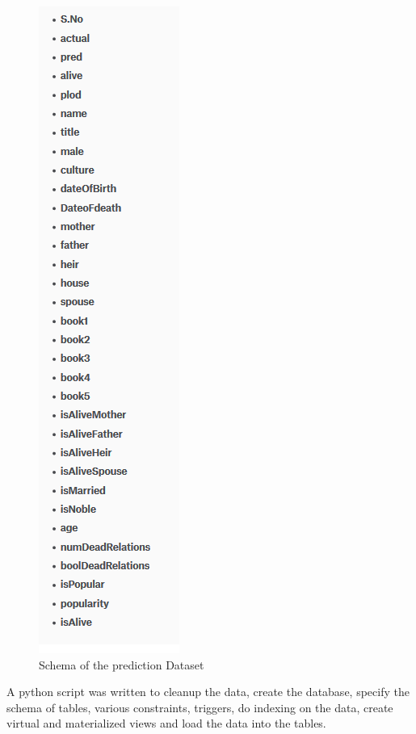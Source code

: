 \documentclass[]{article}
\begin{document}
\begin{itemize}
\begin{figure}
\centering
        \includegraphics[totalheight=13cm]{prediction.png}
		\caption{Schema of the prediction Dataset}
\end{figure}


\end{itemize}

\vspace{25px}

A python script was written to cleanup the data, create the database, specify the schema of tables, various constraints, triggers, do indexing on the data, create virtual and materialized views and load the data into the tables. 
\end{document}
